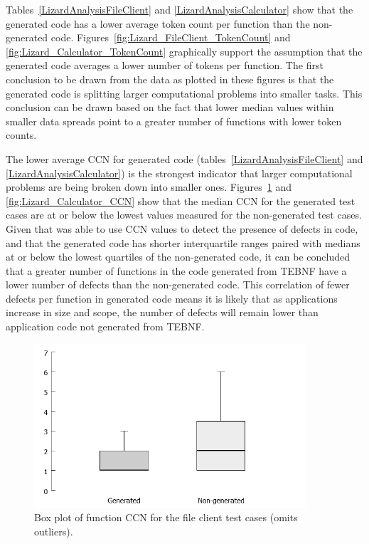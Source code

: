 
\indent
Tables~\ref{LizardAnalysisFileClient} and \ref{LizardAnalysisCalculator} show that the generated code has a lower average token count per function than the non-generated code.  Figures~\ref{fig:Lizard_FileClient_TokenCount} and \ref{fig:Lizard_Calculator_TokenCount} graphically support the assumption that the generated code averages a lower number of tokens per function.  The first conclusion to be drawn from the data as plotted in these figures is that the generated code is splitting larger computational problems into smaller tasks.  This conclusion can be drawn based on the fact that lower median values within smaller data spreads point to a greater number of functions with lower token counts.

\indent
The lower average CCN for generated code (tables~\ref{LizardAnalysisFileClient} and \ref{LizardAnalysisCalculator}) is the strongest indicator that larger computational problems are being broken down into smaller ones.  Figures~\ref{fig:Lizard_FileClient_CCN} and \ref{fig:Lizard_Calculator_CCN} show that the median CCN for the generated test cases are at or below the lowest values measured for the non-generated test cases.  Given that \cite{zhang_01} was able to use CCN values to detect the presence of defects in code, and that the generated code has shorter interquartile ranges paired with medians at or below the lowest quartiles of the non-generated code, it can be concluded that a greater number of functions in the code generated from TEBNF have a lower number of defects than the non-generated code.  This correlation of fewer defects per function in generated code means it is likely that as applications increase in size and scope, the number of defects will remain lower than application code not generated from TEBNF.

\begin{figure}[h!]
\centering
\includegraphics[width=0.9\textwidth]{figures/Lizard_FileClient_CCN.png}
\caption[Box plot of function CCN for the file client test cases.]{Box plot of function CCN for the file client test cases (omits outliers).}
\label{fig:Lizard_FileClient_CCN}
\end{figure}

